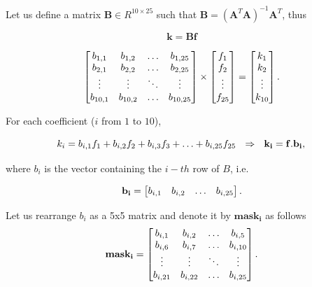\documentclass{ipol}
\numberwithin{equation}{section}
\numberwithin{table}{section}
\begin{document}
{\myn{\label{second_derivative:haralick:normal}} Let us define a matrix $\mathbf{B} \in R^{10\times25}$ such that $\mathbf{B}=(\mathbf{A}^T\mathbf{A})^{-1}\mathbf{A}^T$, thus

$$ \mathbf{k} = \mathbf{B}\mathbf{f} $$

\begin{equation*}
	\begin{bmatrix}
		b_{1,1}		& b_{1,2}	& \hdots	& b_{1,25}	\\
		b_{2,1}		& b_{2,2}	& \hdots	& b_{2,25}	\\
		\vdots		& \vdots	& \ddots	& \vdots	\\
		b_{10,1}	& b_{10,2}	& \hdots	& b_{10,25}
	\end{bmatrix}
	\times
	\begin{bmatrix}
		f_1		\\
		f_2		\\
		\vdots	\\
		f_{25}
	\end{bmatrix}
	=
	\begin{bmatrix}
		k_1		\\
		k_2		\\
		\vdots	\\
		k_{10}
	\end{bmatrix} .\\
\end{equation*}

For each coefficient ($i$ from $1$ to $10$), 

\begin{equation}
	\label{eq:coefficients}
	k_i = b_{i,1}f_1 + b_{i,2}f_2 + b_{i,3}f_3 + \hdots + b_{i,25}f_{25} \ \ \Rightarrow \ \ \mathbf{k_i} = \mathbf{f} . \mathbf{b_i},\\
\end{equation}

where $b_i$ is the vector containing the $i-th$ row of $B$, i.e.\myn{\label{correction_a:second_derivative:haralick_bi}}

\begin{equation}
	\label{eq:b_i_v}
	\mathbf{b_i} = \begin{bmatrix}	b_{i,1}		& b_{i,2}	& \hdots	& b_{i,25}
					\end{bmatrix}.\\
\end{equation}

Let us rearrange $b_i$ as a 5x5 matrix and denote it by $\mathbf{mask_i}$ as follows
\begin{equation}
	\label{eq:b_i}
	\mathbf{mask_i} = \begin{bmatrix}	b_{i,1}		& b_{i,2}	& \hdots	& b_{i,5}	\\
									b_{i,6}		& b_{i,7}	& \hdots	& b_{i,10}	\\
									\vdots		& \vdots	& \ddots	& \vdots	\\
									b_{i,21}	 & b_{i,22}	& \hdots	& b_{i,25}	\\
					\end{bmatrix}.\\
\end{equation}

}
\end{document}
